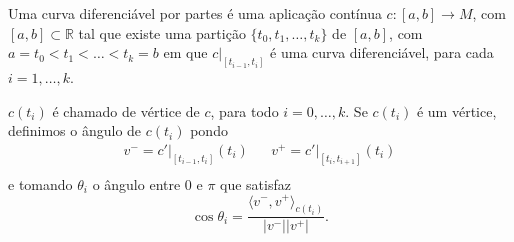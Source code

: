 \begin{definition}
    \label{def:curva-por-partes}
    Uma curva diferenciável por partes é uma aplicação contínua $c:[a,b]\to M$, com $[a,b]\subset \mathbb{R}$ tal que existe uma partição $\{ t_{0}, t_{1}, \dots, t_{k} \}$ de $[a,b]$, com $a=t_{0} <t_{1} < \dots <t_{k}=b$ em que $c|_{[t_{i-1},t_{i}]}$ é uma curva diferenciável, para cada $i=1, \dots, k$.
\end{definition}
$c(t_{i})$ é chamado de vértice de $c$, para todo $i=0, \dots, k$.
Se $c(t_{i})$ é um vértice, definimos o ângulo de $c(t_{i})$ pondo
\begin{align*}
    v^{-}=c'|_{[t_{i-1},t_{i}]}(t_{i}) &  & v^{+}=c'|_{[t_{i},t_{i+1}]}(t_{i}) \\
\end{align*}
e tomando $\theta_{i}$ o ângulo entre $0$ e $\pi$ que satisfaz
\begin{equation*}
    \cos\theta_{i}=\frac{\langle v^{-},v^{+} \rangle_{c(t_{i})} }{|v^{-}| |v^{+}|}.
\end{equation*}



